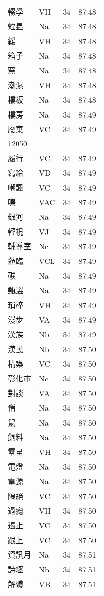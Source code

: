 \documentclass[twocolumn]{book}
\begin{document}
\begin{supertabular}{llrr}
輟學 & VH & 34 &  87.48\\
蝗蟲 & Na & 34 &  87.48\\
緩 & VH & 34 &  87.48\\
箱子 & Na & 34 &  87.48\\
窯 & Na & 34 &  87.48\\
潮濕 & VH & 34 &  87.48\\
樓板 & Na & 34 &  87.48\\
樓房 & Na & 34 &  87.49\\
廢棄 & VC & 34 &  87.49\\
12050\\
履行 & VC & 34 &  87.49\\
寫給 & VD & 34 &  87.49\\
嘲諷 & VC & 34 &  87.49\\
鳴 & VAC & 34 &  87.49\\
銀河 & Na & 34 &  87.49\\
輕視 & VJ & 34 &  87.49\\
輔導室 & Nc & 34 &  87.49\\
蒞臨 & VCL & 34 &  87.49\\
碳 & Na & 34 &  87.49\\
甄選 & Na & 34 &  87.49\\
瑣碎 & VH & 34 &  87.49\\
漫步 & VA & 34 &  87.49\\
漢族 & Nb & 34 &  87.49\\
漢民 & Nb & 34 &  87.50\\
構築 & VC & 34 &  87.50\\
彰化市 & Nc & 34 &  87.50\\
對談 & VA & 34 &  87.50\\
僧 & Na & 34 &  87.50\\
鼠 & Na & 34 &  87.50\\
飼料 & Na & 34 &  87.50\\
零星 & VH & 34 &  87.50\\
電燈 & Na & 34 &  87.50\\
電源 & Na & 34 &  87.50\\
隔絕 & VC & 34 &  87.50\\
過癮 & VH & 34 &  87.50\\
遏止 & VC & 34 &  87.50\\
跟上 & VC & 34 &  87.50\\
資訊月 & Na & 34 &  87.51\\
詩經 & Nb & 34 &  87.51\\
解體 & VB & 34 &  87.51\\

\end{supertabular}
\end{document}
